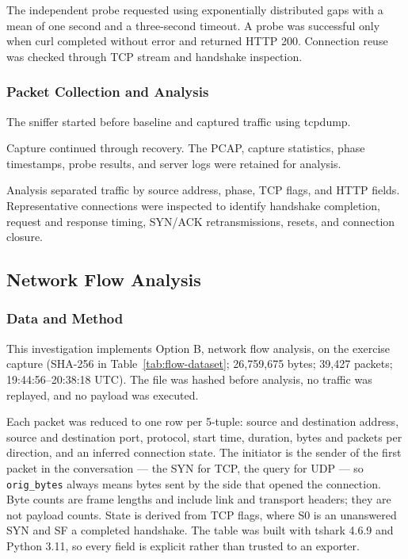 The independent probe requested  using exponentially distributed gaps with a mean of one second and a three-second timeout. A probe was successful only when curl completed without error and returned HTTP 200. Connection reuse was checked through TCP stream and handshake inspection.

\subsubsection{Packet Collection and Analysis}

The sniffer started before baseline and captured traffic using tcpdump.

Capture continued through recovery. The PCAP, capture statistics, phase timestamps, probe results, and server logs were retained for analysis.

Analysis separated traffic by source address, phase, TCP flags, and HTTP fields. Representative connections were inspected to identify handshake completion, request and response timing, SYN/ACK retransmissions, resets, and connection closure.

\subsection{Network Flow Analysis}
\label{sec:flow-analysis}

\subsubsection{Data and Method}

This investigation implements Option B, network flow analysis, on the exercise capture  (SHA-256 in Table~\ref{tab:flow-dataset}; 26,759,675 bytes; 39,427 packets; 19:44:56--20:38:18 UTC). The file was hashed before analysis, no traffic was replayed, and no payload was executed.

Each packet was reduced to one row per 5-tuple: source and destination address, source and destination port, protocol, start time, duration, bytes and packets per direction, and an inferred connection state. The initiator is the sender of the first packet in the conversation --- the SYN for TCP, the query for UDP --- so \texttt{orig\_bytes} always means bytes sent by the side that opened the connection. Byte counts are frame lengths and include link and transport headers; they are not payload counts. State is derived from TCP flags, where S0 is an unanswered SYN and SF a completed handshake. The table was built with tshark 4.6.9 and Python 3.11, so every field is explicit rather than trusted to an exporter.

